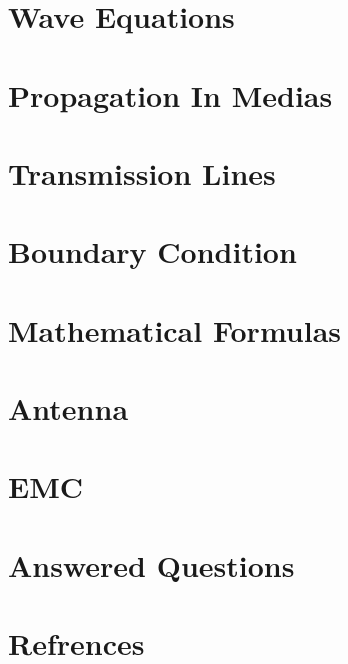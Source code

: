 \documentclass{article}
\begin{document}
\pagecolor{mainTheme}\afterpage{\pagecolor{backCirc}}
\maketitle
\thispagestyle{empty}


\section{Wave Equations}


\vspace{10pt}
\section{Propagation In Medias}


\section{Transmission Lines}


\section{Boundary Condition}




\vspace{10pt}
\section{Mathematical Formulas}


\vspace{10pt}
\section{Antenna}


\vspace{10pt}
\section{EMC}


\section{Answered Questions}


\section{Refrences}\vspace{0.5em}

\end{document}
